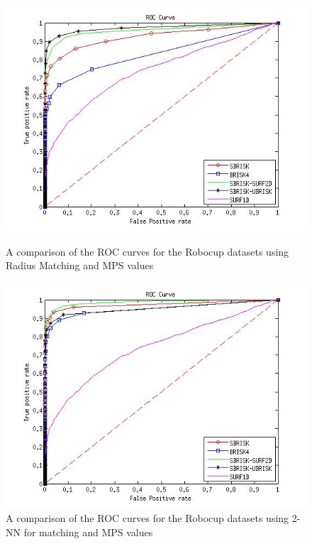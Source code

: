 \begin{figure}[h!]
\begin{minipage}[b]{0.5\linewidth}
\includegraphics[scale=0.4]{../Drawings/RobocupDataset/ROC_General_Hamming_max.jpg}
\caption{A comparison of the ROC curves for the Robocup datasets using Radius Matching and MPS values}
\label{fig:compareHamming}
\end{minipage}
\hspace{0.5cm}
\begin{minipage}[b]{0.5\linewidth}
\includegraphics[scale=0.4]{../Drawings/RobocupDataset/ROC_General_KNN_max.jpg}
\caption{A comparison of the ROC curves for the Robocup datasets using 2-NN for matching and MPS values}
\label{fig:compareKNN}
\end{minipage}
\end{figure}



